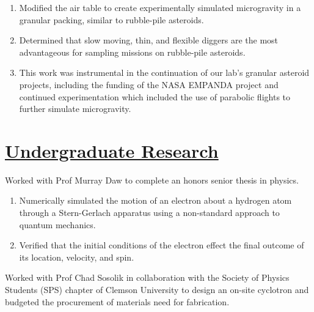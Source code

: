 \documentclass[]{deedy-resume-openfont}
\begin{document}
\begin{minipage}[t]{0.720\textwidth}
\begin{enumerate}[label=\textbullet,leftmargin = !,labelindent = -15pt, itemindent = 0pt, noitemsep, topsep = 0pt]

\item Modified the air table to create experimentally simulated microgravity in a granular packing, similar to rubble-pile asteroids.

\item Determined that slow moving, thin, and flexible diggers are the most advantageous for sampling missions on rubble-pile asteroids.

\item This work was instrumental in the continuation of our lab's granular asteroid projects, including the funding of the NASA EMPANDA project and continued experimentation which included the use of parabolic flights to further simulate microgravity.

\end{enumerate}

\section{\underline{Undergraduate Research}}

Worked with Prof Murray Daw to complete an honors senior thesis in physics.

\begin{enumerate}[label=\textbullet,leftmargin = !,labelindent = -15pt, itemindent = 0pt, noitemsep, topsep = 0pt]

\item Numerically simulated the motion of an electron about a hydrogen atom through a Stern-Gerlach apparatus using a non-standard approach to quantum mechanics.

\item Verified that the initial conditions of the electron effect the final outcome of its location, velocity, and spin.

\end{enumerate}

\sectionsep

Worked with Prof Chad Sosolik in collaboration with the Society of Physics Students (SPS) chapter of Clemson University to design an on-site cyclotron and budgeted the procurement of materials need for fabrication.


\end{minipage}
\end{document}

